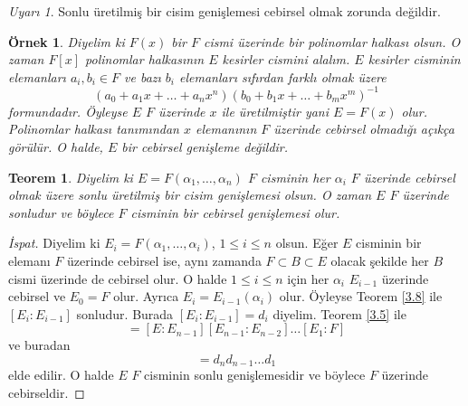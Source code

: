 \documentclass{article}
\newtheorem{thm}{Teorem}[section]
\newtheorem{exmp}{Örnek}
\theoremstyle{definition}
\theoremstyle{remark}
\newtheorem{rem}{Uyarı}[section]
\begin{document}
            \begin{rem}
                Sonlu üretilmiş bir cisim genişlemesi cebirsel olmak zorunda değildir.
            \end{rem}
            
             \begin{exmp}
                Diyelim ki $F(x)$ bir $F$ cismi üzerinde bir polinomlar halkası olsun. O zaman $F[x]$ polinomlar halkasının $E$ kesirler cismini alalım. $E$ kesirler cisminin elemanları $a_i, b_i \in F$ ve bazı $b_i$ elemanları sıfırdan farklı olmak üzere
                \begin{equation*}
                    (a_0 + a_1x + \dots + a_nx^n)(b_0 + b_1x + \dots + b_mx^m)^{-1}
                \end{equation*}
                formundadır. Öyleyse $E$ $F$ üzerinde $x$ ile üretilmiştir yani $E = F(x)$ olur. Polinomlar halkası tanımından $x$ elemanının $F$ üzerinde cebirsel olmadığı açıkça görülür. O halde, $E$ bir cebirsel genişleme değildir.
            \end{exmp}
            
            \begin{thm}\label{3.11}
                Diyelim ki $E = F(\alpha_1, \dots, \alpha_n)$ $F$ cisminin her $\alpha_i$ $F$ üzerinde cebirsel olmak üzere sonlu üretilmiş bir cisim genişlemesi olsun. O zaman $E$ $F$ üzerinde sonludur ve böylece $F$ cisminin bir cebirsel genişlemesi olur.
            \end{thm}
            
            \begin{proof}[İspat]
                Diyelim ki $E_i = F(\alpha_1, \dots, \alpha_i)$, $1 \leq i \leq n$ olsun. Eğer $E$ cisminin bir elemanı $F$ üzerinde cebirsel ise, aynı zamanda $F \subset B \subset E$ olacak şekilde her $B$ cismi üzerinde de cebirsel olur. O halde $1 \leq i \leq n$ için her $\alpha_i$ $E_{i - 1}$ üzerinde cebirsel ve $E_0 = F$ olur. Ayrıca $E_i = E_{i - 1}(\alpha_i)$ olur. Öyleyse Teorem \ref{3.8} ile $[E_i : E_{i - 1}]$ sonludur. Burada $[E_i : E_{i - 1}] = d_i$ diyelim. Teorem \ref{3.5} ile
                \begin{equation*}
                    [E:F] = [E:E_{n - 1}][E_{n - 1}:E_{n - 2}] \dots [E_1:F]
                \end{equation*}
                ve buradan
                \begin{equation*}
                    [E:F] = d_nd_{n - 1} \dots d_1
                \end{equation*}
                elde edilir. O halde $E$ $F$ cisminin sonlu genişlemesidir ve böylece $F$ üzerinde cebirseldir.
            \end{proof}
            
\end{document}
